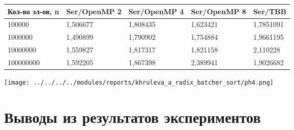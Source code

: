 \documentclass[a4paper,final]{report}
\begin{document}
\begin{spacing}{1.5}
\begin{table}[ht!]
\begin{tabular}{|p{2.8cm}|p{3.1cm}|p{3.1cm}|p{3.1cm}|p{2.8cm}|}
					Кол-во эл-ов, n & Ser/OpenMP 2  & Ser/OpenMP 4 & Ser/OpenMP 8 & Ser/TBB  \\ \hline
				
				100000 & 1,506677 & 1,808435 & 1,623421 & 1,7851091 \\ \hline
				
				1000000 & 1,490899 & 1,790902 & 1,754884 & 1,9661195 \\ \hline
				
				10000000 & 1,559827 & 1,817317 & 1,821158 & 2,110228 \\ \hline
				
				100000000 & 1,592205 & 1,867398 & 2,389941 & 1,9026682 \\ \hline
				
			\end{tabular}
		\end{table}
		
		\vspace{4ex}
        
		\begin{center}
        \texttt{[image: ../../../../modules/reports/khruleva\_a\_radix\_batcher\_sort/ph4.png]}
        \end{center}
        
		\vspace{2ex}
		
		
		\newpage
		\section{Выводы из результатов экспериментов}
		

\end{spacing}
\end{document}
